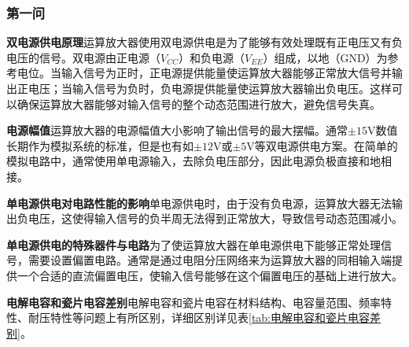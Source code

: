 \documentclass[./测控三级项目.tex]{subfiles} %
\begin{document}
	\subsubsection{第一问}
	\textbf{双电源供电原理}\quad 运算放大器使用双电源供电是为了能够有效处理既有正电压又有负电压的信号。双电源由正电源（$V_{CC}$）和负电源（$V_{EE}$）组成，以地（GND）为参考电位。当输入信号为正时，正电源提供能量使运算放大器能够正常放大信号并输出正电压；当输入信号为负时，负电源提供能量使运算放大器输出负电压。这样可以确保运算放大器能够对输入信号的整个动态范围进行放大，避免信号失真。\par
	\textbf{电源幅值}\quad 运算放大器的电源幅值大小影响了输出信号的最大摆幅。通常$\pm15$V数值长期作为模拟系统的标准，但是也有如$\pm12$V或$\pm5$V等双电源供电方案。在简单的模拟电路中，通常使用单电源输入，去除负电压部分，因此电源负极直接和地相接。\par
	\textbf{单电源供电对电路性能的影响}\quad 单电源供电时，由于没有负电源，运算放大器无法输出负电压，这使得输入信号的负半周无法得到正常放大，导致信号动态范围减小。\par
	\textbf{单电源供电的特殊器件与电路}\quad 为了使运算放大器在单电源供电下能够正常处理信号，需要设置偏置电路。通常是通过电阻分压网络来为运算放大器的同相输入端提供一个合适的直流偏置电压，使输入信号能够在这个偏置电压的基础上进行放大。\par
	\textbf{电解电容和瓷片电容差别}\quad 电解电容和瓷片电容在材料结构、电容量范围、频率特性、耐压特性等问题上有所区别，详细区别详见表\ref{tab:电解电容和瓷片电容差别}。
\end{document}
